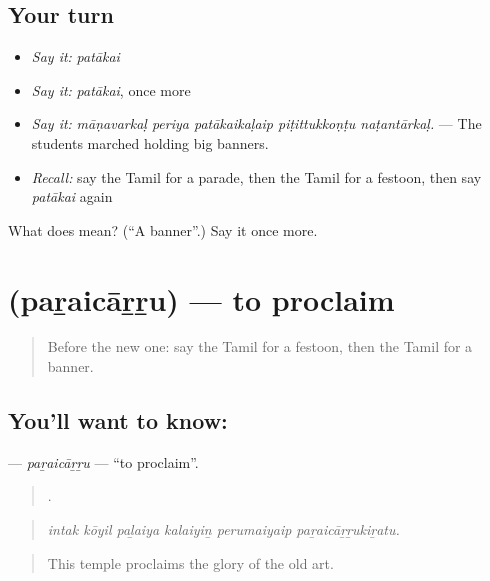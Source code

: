 \subsection*{Your turn}
\begin{itemize}
\raggedright
  \item \emph{Say it:} \emph{patākai}
  \item \emph{Say it:} \emph{patākai}, once more
  \item \emph{Say it:} \emph{māṇavarkaḷ periya patākaikaḷaip piṭittukkoṇṭu naṭantārkaḷ.} — The students marched holding big banners.
  \item \emph{Recall:} say the Tamil for a parade, then the Tamil for a festoon, then say \emph{patākai} again
\end{itemize}

\begin{tcolorbox}[breakable,colback=teal!4,colframe=teal!35!black,title={Before you move on}]
What does  mean? (\textquotedblleft{}A banner\textquotedblright{}.) Say it once more.
\end{tcolorbox}
\section[\texorpdfstring{\ta{பறைசாற்று} (paṟaicāṟṟu)}{பறைசாற்று (paṟaicāṟṟu)}]{ (paṟaicāṟṟu) — to proclaim}

\label{lesson:TA-C320-paraicarru}



\begin{quote}
Before the new one: say the Tamil for a festoon, then the Tamil for a banner.
\end{quote}

\subsection*{You'll want to know: }
\textbf{} — \emph{paṟaicāṟṟu} — \textquotedblleft{}to proclaim\textquotedblright{}.

\begin{quote}
     .
\end{quote}

\begin{quote}
\emph{intak kōyil paḻaiya kalaiyiṉ perumaiyaip paṟaicāṟṟukiṟatu.}
\end{quote}

\begin{quote}
This temple proclaims the glory of the old art.
\end{quote}

